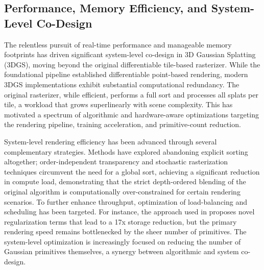 \documentclass[11pt,a4paper]{article}
\begin{document}
\subsection{Performance, Memory Efficiency, and System-Level Co-Design}


The relentless pursuit of real-time performance and manageable memory footprints has driven significant system-level co-design in 3D Gaussian Splatting (3DGS), moving beyond the original differentiable tile-based rasterizer. While the foundational pipeline \cite{arxiv:1906.04173v3} established differentiable point-based rendering, modern 3DGS implementations exhibit substantial computational redundancy. The original rasterizer, while efficient, performs a full sort and processes all splats per tile, a workload that grows superlinearly with scene complexity. This has motivated a spectrum of algorithmic and hardware-aware optimizations targeting the rendering pipeline, training acceleration, and primitive-count reduction.

System-level rendering efficiency has been advanced through several complementary strategies. Methods have explored abandoning explicit sorting altogether; order-independent transparency and stochastic rasterization techniques circumvent the need for a global sort, achieving a significant reduction in compute load, demonstrating that the strict depth-ordered blending of the original algorithm is computationally over-constrained for certain rendering scenarios. To further enhance throughput, optimization of load-balancing and scheduling has been targeted. For instance, the approach used in \cite{arxiv:2411.08508v4} proposes novel regularization terms that lead to a 17x storage reduction, but the primary rendering speed remains bottlenecked by the sheer number of primitives. The system-level optimization is increasingly focused on reducing the number of Gaussian primitives themselves, a synergy between algorithmic and system co-design.
\end{document}
